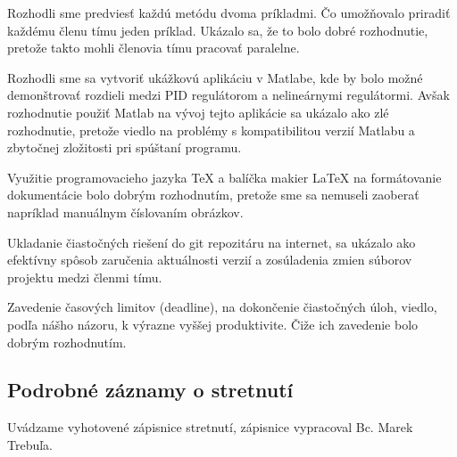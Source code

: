 \documentclass[../main.tex]{subfiles}
\begin{document}
    Rozhodli sme predviesť každú metódu dvoma príkladmi. Čo umožňovalo priradiť každému členu tímu jeden príklad. Ukázalo sa, že to bolo dobré rozhodnutie, pretože takto mohli členovia tímu pracovať paralelne.

    Rozhodli sme sa vytvoriť ukážkovú aplikáciu v Matlabe, kde by bolo možné demonštrovať rozdieli medzi PID regulátorom a nelineárnymi regulátormi. Avšak rozhodnutie použiť Matlab na vývoj tejto aplikácie sa ukázalo ako zlé rozhodnutie, pretože viedlo na problémy s kompatibilitou verzií Matlabu a zbytočnej zložitosti pri spúštaní programu.

    Využitie programovacieho jazyka TeX a balíčka makier LaTeX na formátovanie dokumentácie bolo dobrým rozhodnutím, pretože sme sa nemuseli zaoberať napríklad manuálnym číslovaním obrázkov.

    Ukladanie čiastočných riešení do git repozitáru na internet, sa ukázalo ako efektívny spôsob zaručenia aktuálnosti verzií a zosúladenia zmien súborov projektu medzi členmi tímu.

    Zavedenie časových limitov (deadline), na dokončenie čiastočných úloh, viedlo, podľa nášho názoru, k výrazne vyššej produktivite. Čiže ich zavedenie bolo dobrým rozhodnutím.
    
    \subsection{Podrobné záznamy o stretnutí}
    Uvádzame vyhotovené zápisnice stretnutí, zápisnice vypracoval Bc. Marek Trebuľa.

    
    
    
    
    
    
    
    
    
    
\end{document}
